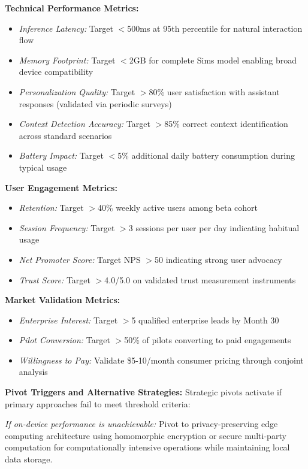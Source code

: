 \documentclass[11pt]{article}
\begin{document}
\textbf{Technical Performance Metrics:}
\begin{itemize}[noitemsep]
    \item \textit{Inference Latency:} Target $<$500ms at 95th percentile for natural interaction flow
    \item \textit{Memory Footprint:} Target $<$2GB for complete Sims model enabling broad device compatibility
    \item \textit{Personalization Quality:} Target $>$80\% user satisfaction with assistant responses (validated via periodic surveys)
    \item \textit{Context Detection Accuracy:} Target $>$85\% correct context identification across standard scenarios
    \item \textit{Battery Impact:} Target $<$5\% additional daily battery consumption during typical usage
\end{itemize}

\textbf{User Engagement Metrics:}
\begin{itemize}[noitemsep]
    \item \textit{Retention:} Target $>$40\% weekly active users among beta cohort
    \item \textit{Session Frequency:} Target $>$3 sessions per user per day indicating habitual usage
    \item \textit{Net Promoter Score:} Target NPS $>$50 indicating strong user advocacy
    \item \textit{Trust Score:} Target $>$4.0/5.0 on validated trust measurement instruments
\end{itemize}

\textbf{Market Validation Metrics:}
\begin{itemize}[noitemsep]
    \item \textit{Enterprise Interest:} Target $>$5 qualified enterprise leads by Month 30
    \item \textit{Pilot Conversion:} Target $>$50\% of pilots converting to paid engagements
    \item \textit{Willingness to Pay:} Validate \$5-10/month consumer pricing through conjoint analysis
\end{itemize}

\textbf{Pivot Triggers and Alternative Strategies:}
Strategic pivots activate if primary approaches fail to meet threshold criteria:

\textit{If on-device performance is unachievable:} Pivot to privacy-preserving edge computing architecture using homomorphic encryption or secure multi-party computation for computationally intensive operations while maintaining local data storage.
\end{document}
